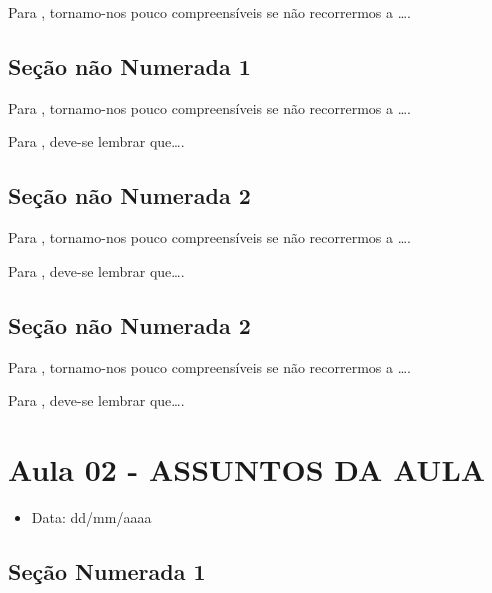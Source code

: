 \documentclass[
]{book}
\providecommand{\tightlist}{%
  \setlength{\itemsep}{0pt}\setlength{\parskip}{0pt}}
\begin{document}
Para \citet{BOCK2001}, tornamo-nos pouco compreensíveis se não recorrermos a \ldots.

\hypertarget{seuxe7uxe3o-nuxe3o-numerada-1-17}{%
\subsection*{Seção não Numerada 1}\label{seuxe7uxe3o-nuxe3o-numerada-1-17}}

Para \citet{BOCK2001}, tornamo-nos pouco compreensíveis se não recorrermos a \ldots.

Para \citet{DAVIDOFF2001}, deve-se lembrar que\ldots.

\hypertarget{seuxe7uxe3o-nuxe3o-numerada-2-25}{%
\subsection*{Seção não Numerada 2}\label{seuxe7uxe3o-nuxe3o-numerada-2-25}}

Para \citet{BOCK2001}, tornamo-nos pouco compreensíveis se não recorrermos a \ldots.

Para \citet{DAVIDOFF2001}, deve-se lembrar que\ldots.

\hypertarget{seuxe7uxe3o-nuxe3o-numerada-2-26}{%
\subsection*{Seção não Numerada 2}\label{seuxe7uxe3o-nuxe3o-numerada-2-26}}

Para \citet{BOCK2001}, tornamo-nos pouco compreensíveis se não recorrermos a \ldots.

Para \citet{DAVIDOFF2001}, deve-se lembrar que\ldots.

\hypertarget{aula-02---assuntos-da-aula-2}{%
\section{Aula 02 - ASSUNTOS DA AULA}\label{aula-02---assuntos-da-aula-2}}

\begin{itemize}
\tightlist
\item
  Data: dd/mm/aaaa
\end{itemize}

\hypertarget{seuxe7uxe3o-numerada-1-9}{%
\subsection{Seção Numerada 1}\label{seuxe7uxe3o-numerada-1-9}}
\end{document}
